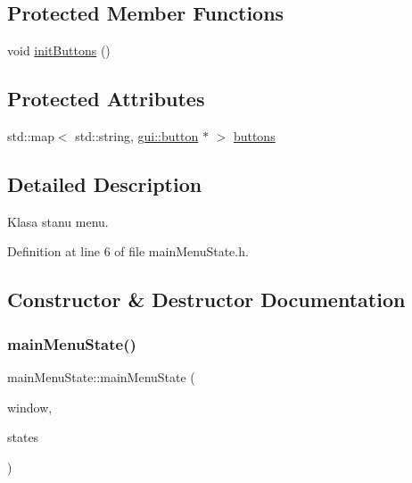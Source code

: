 \subsection*{Protected Member Functions}
\begin{DoxyCompactItemize}
\item 
void \mbox{\hyperlink{classmain_menu_state_a714ee680a76399e6b57c18954d045f58}{init\+Buttons}} ()
\end{DoxyCompactItemize}
\subsection*{Protected Attributes}
\begin{DoxyCompactItemize}
\item 
std\+::map$<$ std\+::string, \mbox{\hyperlink{classgui_1_1button}{gui\+::button}} $\ast$ $>$ \mbox{\hyperlink{classmain_menu_state_af1b67560d8a49f19c111a31a9d91dd41}{buttons}}
\end{DoxyCompactItemize}


\subsection{Detailed Description}
Klasa stanu menu. 

Definition at line 6 of file main\+Menu\+State.\+h.



\subsection{Constructor \& Destructor Documentation}
\mbox{\label{classmain_menu_state_aea1bcc67a75fb1ee79695e7bce5fff3b}} 
\subsubsection{\texorpdfstring{main\+Menu\+State()}{mainMenuState()}}
{\footnotesize\ttfamily main\+Menu\+State\+::main\+Menu\+State (\begin{DoxyParamCaption}\item[{sf\+::\+Render\+Window $\ast$}]{window,  }\item[{std\+::stack$<$ \mbox{\hyperlink{classstate}{state}} $\ast$$>$ $\ast$}]{states }\end{DoxyParamCaption})}



